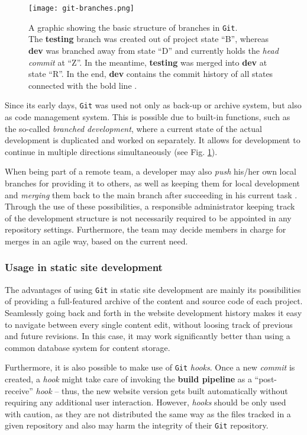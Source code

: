 \begin{figure} %
    \centering
    \texttt{[image: git-branches.png]}
    \caption{A graphic showing the basic structure of branches in \texttt{Git}.\\
    The \textbf{testing} branch was created out of project state ``B'', whereas \textbf{dev} was branched away from state ``D'' and currently holds the \emph{head commit} at ``Z''. In the meantime, \textbf{testing} was merged into \textbf{dev} at state ``R''. In the end, \textbf{dev} contains the commit history of all states connected with the bold line \cite[p. 92f]{loeliger2012version}.}
    \label{fig:git-branches}
\end{figure}
%

Since its early days, \texttt{Git} was used not only as back-up or archive system, but also as code management system. This is possible due to built-in functions, such as the so-called \emph{branched development}, where a current state of the actual development is duplicated and worked on separately. It allows for development to continue in multiple directions simultaneously \cite[89]{loeliger2012version} (see Fig. \ref{fig:git-branches}).

When being part of a remote team, a developer may also \emph{push} his/her own local branches for providing it to others, as well as keeping them for local development and \emph{merging} them back to the main branch after succeeding in his current task \cite[207]{dhillon2016}. Through the use of these possibilities, a responsible administrator keeping track of the development structure is not necessarily required to be appointed in any repository settings. Furthermore, the team may decide members in charge for merges in an agile way, based on the current need.

\subsubsection{Usage in static site development}
The advantages of using \texttt{Git} in static site development are mainly its possibilities of providing a full-featured archive of the content and source code of each project. Seamlessly going back and forth in the website development history makes it easy to navigate between every single content edit, without loosing track of previous and future revisions. In this case, it may work significantly better than using a common database system for content storage.

Furthermore, it is also possible to make use of \texttt{Git} \emph{hooks}. Once a new \emph{commit} is created, a \emph{hook} might take care of invoking the \textbf{build pipeline} as a ``post-receive'' \emph{hook} -- thus, the new website version gets built automatically without requiring any additional user interaction. However, \emph{hooks} should be only used with caution, as they are not distributed the same way as the files tracked in a given repository and also may harm the integrity of their \texttt{Git} repository.
